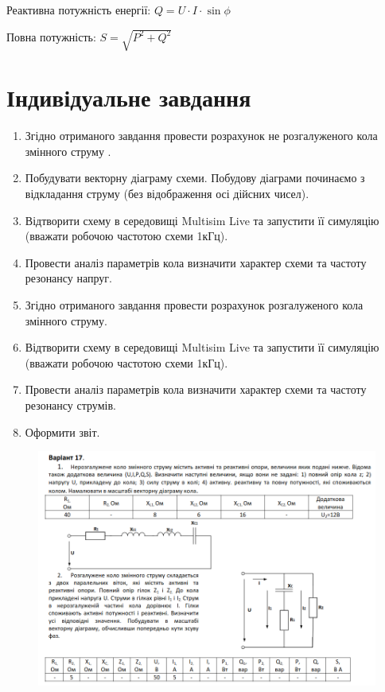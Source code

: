 \documentclass{article}
\begin{document}
\begin{normalsize}
	Реактивна потужність енергії: $Q=U\cdot I\cdot\sin\phi$
	
	Повна потужність: $S=\sqrt{P^2+Q^2}$
	
		\section*{Індивідуальне завдання}
	\begin{enumerate}
		\item Згідно отриманого завдання провести розрахунок не розгалуженого кола
		змінного струму .
		\item Побудувати векторну діаграму схеми. Побудову діаграми починаємо з
		відкладання струму (без відображення осі дійсних чисел).
		\item Відтворити схему в середовищі Multisim Live та запустити її симуляцію
		(вважати робочою частотою схеми 1кГц).
		\item Провести аналіз параметрів кола визначити характер схеми та частоту
		резонансу напруг.
		\item Згідно отриманого завдання провести розрахунок розгалуженого кола
		змінного струму.
		\item Відтворити схему в середовищі Multisim Live та запустити її симуляцію
		(вважати робочою частотою схеми 1кГц).
		\item Провести аналіз параметрів кола визначити характер схеми та частоту
		резонансу струмів.
		\item Оформити звіт.
	\end{enumerate}
	
	\begin{figure}[H]
		\centering
		\includegraphics[scale=0.5]{v}
	\end{figure}
	

\end{normalsize}
\end{document}
